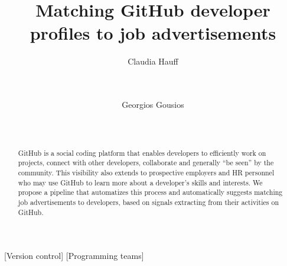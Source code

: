 \documentclass{sig-alternate}
\begin{document}
\newcommand{\ghtorrent}{ \textsc{ght}orrent\xspace}
\newcommand{\api}{\textsc{api}\xspace}

\newcommand{\nb}[3]{
  \fcolorbox{black}{#2}{\bfseries\sffamily\scriptsize#1}
    {\sf\small$\blacktriangleright$\textit{#3}$\blacktriangleleft$}
}

\newcommand\georgios[1]{\nb{Georgios}{yellow}{#1}}
\newcommand\alberto[1]{\nb{Claudia}{cyan}{#1}}


\newcommand{\hassanbox}[1]
{
  \vspace{0.29em}
  \noindent
  \fbox{
  \begin{minipage}{0.46\textwidth}
    \emph{\noindent #1}
    \end{minipage}
}}

\newcommand{\resp}[2]{{\sc R#1:} ``\emph{#2}''}
\newcommand{\respnum}[1]{{\sc R#1}}
\newcommand{\code}[1]{{\textsl{#1}}}

\title{Matching GitHub developer profiles to job advertisements}

\author{
\alignauthor
Claudia Hauff\\
       \\
       \\
\and
Georgios Gousios\\
       \\
       \\
}

\maketitle

\begin{abstract}
GitHub is a social coding platform that enables developers to efficiently work on projects, connect with other developers, collaborate and generally ``be seen'' by the community. This visibility also extends to prospective employers and HR personnel who may use GitHub to learn more about a developer's skills and interests. We propose a pipeline that automatizes this process and automatically suggests matching job advertisements to developers, based on signals extracting from their activities on GitHub.
\end{abstract}

[Version control]
[Programming teams]
\end{document}
